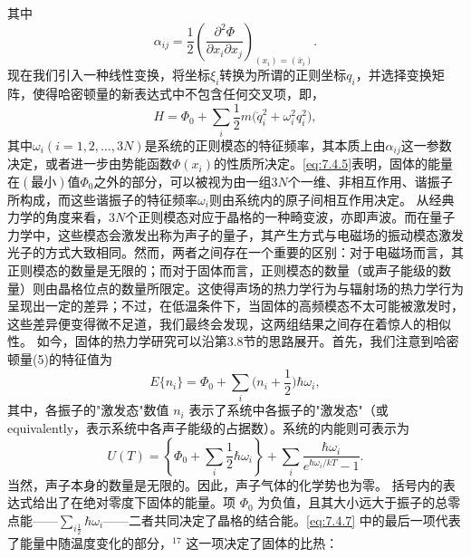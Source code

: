 其中
\begin{equation}\tag{7.4.4}\label{eq:7.4.4}
\alpha _ { i j } = \frac { 1 } { 2 } \left( \frac { \partial ^{2} \Phi } { \partial x _ { i } \partial x _ { j } } \right) _ { ( x _ { i } ) = ( \overline { { x } } _ { i } ) } .
\end{equation}
现在我们引入一种线性变换，将坐标\(\xi_{i}\)转换为所谓的正则坐标\(q_{i}\)，并选择变换矩阵，使得哈密顿量的新表达式中不包含任何交叉项，即，
\begin{equation}\tag{7.4.5}\label{eq:7.4.5}
H = \Phi _ { 0 } + \sum _ { i } \frac { 1 } { 2 } m \Big ( \dot { q } _ { i } ^{2} + \omega _ { i } ^{2} q _ { i } ^{2} \Big ) ,
\end{equation}
其中\(\omega_{i}(i=1,2,\ldots,3N)\)是系统的正则模态的特征频率，其本质上由\(\alpha_{ij}\)这一参数决定，或者进一步由势能函数\(\Phi(x_{i})\)的性质所决定。\autoref{eq:7.4.5}表明，固体的能量在\((最小)\)值\(\Phi_{0}\)之外的部分，可以被视为由一组\(3N\)个一维、非相互作用、谐振子所构成，而这些谐振子的特征频率\(\omega_{i}\)则由系统内的原子间相互作用决定。
从经典力学的角度来看，\(3N\)个正则模态对应于晶格的一种畸变波，亦即声波。而在量子力学中，这些模态会激发出称为声子的量子，其产生方式与电磁场的振动模态激发光子的方式大致相同。然而，两者之间存在一个重要的区别：对于电磁场而言，其正则模态的数量是无限的；而对于固体而言，正则模态的数量（或声子能级的数量）则由晶格位点的数量所限定。这使得声场的热力学行为与辐射场的热力学行为呈现出一定的差异；不过，在低温条件下，当固体的高频模态不太可能被激发时，这些差异便变得微不足道，我们最终会发现，这两组结果之间存在着惊人的相似性。
如今，固体的热力学研究可以沿第3.8节的思路展开。首先，我们注意到哈密顿量(5)的特征值为
\begin{equation}\tag{7.4.6}\label{eq:7.4.6}
E \{ n _ { i } \} = \Phi _ { 0 } + \sum _ { i } \Big ( n _ { i } + \frac { 1 } { 2 } \Big ) \hbar \omega _ { i } ,
\end{equation}
其中，各振子的"激发态"数值 \(n_{i}\) 表示了系统中各振子的"激发态"（或 equivalently，表示系统中各声子能级的占据数）。系统的内能则可表示为
\begin{equation}\tag{7.4.7}\label{eq:7.4.7}
U ( T ) = \left\{ \Phi _ { 0 } + \sum _ { i } \frac { 1 } { 2 } \hbar \omega _ { i } \right\} + \sum _ { i } \frac { \hbar \omega _ { i } } { e ^{\hbar \omega _ { i} / k T } - 1 } .
\end{equation}
当然，声子本身的数量是无限的。因此，声子气体的化学势也为零。
括号内的表达式给出了在绝对零度下固体的能量。项 \(\Phi_{0}\) 为负值，且其大小远大于振子的总零点能——\(\sum_{i\frac{1}{2}}\hbar\omega_{i}\)——二者共同决定了晶格的结合能。\autoref{eq:7.4.7} 中的最后一项代表了能量中随温度变化的部分，\(^{17}\) 这一项决定了固体的比热：
